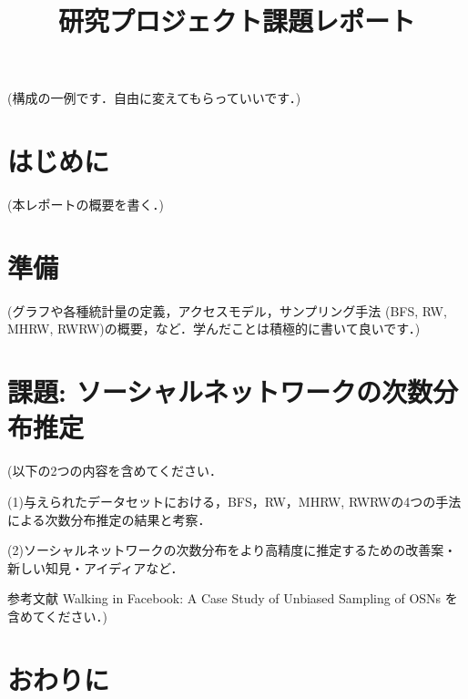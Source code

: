 \documentclass{ujarticle}
\title{研究プロジェクト課題レポート}
\author{}
\begin{document}
\date{}
\maketitle

(構成の一例です．自由に変えてもらっていいです．)

\section{はじめに}

(本レポートの概要を書く．)

\section{準備}

(グラフや各種統計量の定義，アクセスモデル，サンプリング手法 (BFS, RW, MHRW, RWRW)の概要，など．学んだことは積極的に書いて良いです．)

\section{課題: ソーシャルネットワークの次数分布推定}

(以下の2つの内容を含めてください．

(1)与えられたデータセットにおける，BFS，RW，MHRW, RWRWの4つの手法による次数分布推定の結果と考察．

(2)ソーシャルネットワークの次数分布をより高精度に推定するための改善案・新しい知見・アイディアなど．

参考文献 Walking in Facebook: A Case Study of Unbiased Sampling of OSNs \cite{gjoka}を含めてください．)

\section{おわりに}



 
\end{document}
